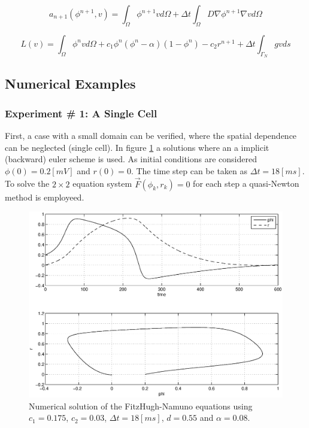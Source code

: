 \begin{equation}
a_{n+1}(\phi^{n+1}, v) = \int_{\Omega} \phi^{n+1} v d \Omega + \Delta t \int_{\Omega} D \nabla \phi^{n+1} \nabla v d \Omega \label{eq:esquema_explicito}
\end{equation}

\begin{equation*}
L(v) =  \int_{\Omega} \phi^n v d \Omega + c_1 \phi^n (\phi^n - \alpha)(1 - \phi^n) - c_2 r^{n+1}+ \Delta t \int_{\Gamma_N} g  v ds 
\end{equation*}



\subsection{Numerical Examples}
\subsubsection{Experiment \# 1: A Single Cell}

 First, a case with a small domain can be verified, where the spatial dependence can be neglected (single cell). In figure \ref{fig:fhn_nofisiologico2} a solutions where an  a implicit (backward) euler scheme is used. As initial conditions are considered $\phi(0) = 0.2 [mV]$ and $r(0) = 0$. The time step can be taken as $\Delta t = 18 [ms]$. To solve the $2 \times 2$ equation system $\vec{F}(\phi_k, r_k) = 0$ for each step a quasi-Newton method is employeed.

\begin{figure}[H]
\centering 
\includegraphics[height = 8.5 cm]{fig/reaction_term-FHN_implicit}
\caption{Numerical solution of the FitzHugh-Namuno equations using $c_1 = 0.175$, $c_2 = 0.03$, $\Delta t = 18 [ms]$, $d = 0.55$ and $\alpha = 0.08$.}
\label{fig:fhn_nofisiologico2}
\end{figure}

